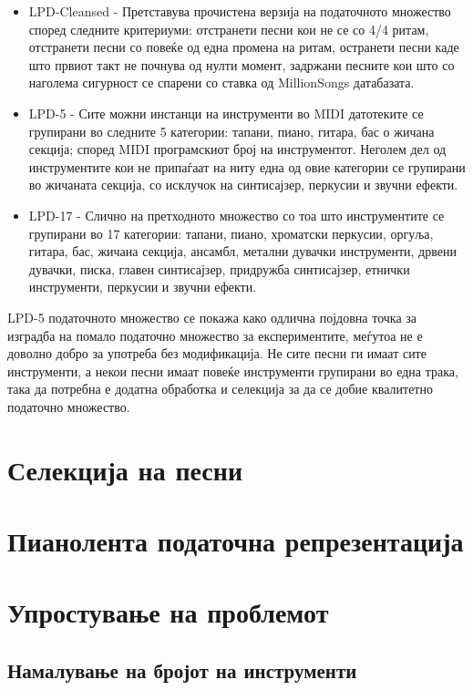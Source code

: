 \begin{itemize}
    \item LPD-Cleansed - Претставува прочистена верзија на податочното множество според следните критериуми: отстранети песни кои не се со 4/4 ритам, отстранети песни со повеќе од една промена на ритам, остранети песни каде што првиот такт не почнува од нулти момент, задржани песните кои што со наголема сигурност се спарени со ставка од MillionSongs датабазата.
    \item LPD-5 - Сите можни инстанци на инструменти во MIDI датотеките се групирани во следните 5 категории: тапани, пиано, гитара, бас о жичана секција; според MIDI програмскиот број на инструментот. Неголем дел од инструментите кои не припаѓаат на ниту една од овие категории се групирани во жичаната секција, со исклучок на синтисајзер, перкусии и звучни ефекти.
    \item LPD-17 - Слично на претходното множество со тоа што инструментите се групирани во 17 категории: тапани, пиано, хроматски перкусии, оргуља, гитара, бас, жичана секција, ансамбл, метални дувачки инструменти, дрвени дувачки, писка, главен синтисајзер, придружба синтисајзер, етнички инструменти, перкусии и звучни ефекти.
\end{itemize}

LPD-5 податочното множество се покажа како одлична појдовна точка за изградба на помало податочно множество за експериментите, меѓутоа не е доволно добро за употреба без модификација. Не сите песни ги имаат сите инструменти, а некои песни имаат повеќе инструменти групирани во една трака, така да потребна е додатна обработка и селекција за да се добие квалитетно податочно множество.

\section{Селекција на песни}

\section{Пианолента податочна репрезентација}

\section{Упростување на проблемот}

\subsection{Намалување на бројот на инструменти}

